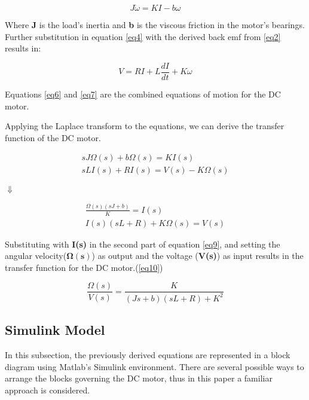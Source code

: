 {\begin{equation} \label{eq6}
J\dot{\omega} = KI - b\omega
\end{equation}

Where \textbf{J} is the load's inertia and \textbf{b} is the viscous friction in the motor's bearings.
Further substitution in equation \ref{eq4} with the derived back emf from \ref{eq2} results in:

\begin{equation} \label{eq7}
V = RI + L\frac{dI}{dt} + K\omega
\end{equation}

Equations \ref{eq6} and \ref{eq7} are the combined equations of motion for the DC motor.

Applying the Laplace transform to the equations, we can derive the transfer function of the DC motor.

\begin{align}  
sJ\Omega(s) + b\Omega(s) = KI(s) \label{eq8}\\
sLI(s) + RI(s) = V(s) - K\Omega(s) \nonumber
\end{align}

\begin{center}
$\Downarrow$
\end{center}

\begin{align} 
\frac{\Omega(s)(sJ + b)}{K} = I(s) \label{eq9} \\
I(s)(sL + R) + K\Omega(s) = V(s)  \nonumber 
\end{align}

Substituting with \textbf{I(s)} in the second part of equation \ref{eq9}, and setting the angular velocity($\boldsymbol{\Omega(s)}$) as output and the voltage (\textbf{V(s)}) as input results in the transfer function for the DC motor.(\ref{eq10})

\begin{equation} \label{eq10}
\frac{\Omega(s)}{V(s)} = \frac{K}{(Js + b)(sL + R) + K^2}
\end{equation}

\subsection{Simulink Model} \label{dc_model}

In this subsection, the previously derived equations are represented in a block diagram using Matlab's Simulink environment. There are several possible ways to arrange the blocks governing the DC motor, thus in this paper a familiar approach is considered.

}
